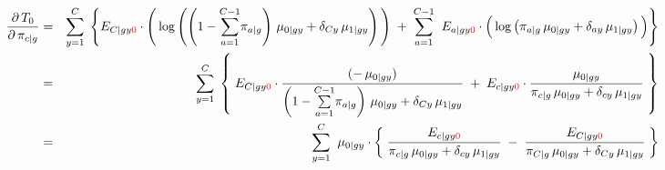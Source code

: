 \begin{eqnarray*}
\dfrac{\partial\,T_{0}}{\partial\,\pi_{c \vert g}}
&=&
	\overset{C}{\underset{y=1}{\sum}}\;
	\left\{
	E_{C \vert gy{\color{red}0}}
	\cdot
	\left(\,
		\overset{{\color{white}.}}{\log}\left(
			\left(1-\overset{C-1}{\underset{a=1}{\sum}}\pi_{a \vert g}\right)\,\mu_{0 \vert gy}
			+
			\delta_{Cy}\,\mu_{1\vert gy}
			\right)
	\,\right)
	\;+\;
	\overset{C-1}{\underset{a=1}{\sum}}\;\;
	E_{a \vert gy{\color{red}0}}
	\cdot
	\left(\,
		\overset{{\color{white}.}}{\log}\left(\pi_{a \vert g}\,\mu_{0 \vert gy} + \delta_{ay}\,\mu_{1\vert gy}\right)
	\,\right)
	\right\}
\\
&=&
	\overset{C}{\underset{y=1}{\sum}}\;
	\left\{\;
	E_{C \vert gy{\color{red}0}}
	\cdot
	\dfrac{(-\,\mu_{0 \vert gy})}{
		\left(1-\overset{C-1}{\underset{a=1}{\sum}}\pi_{a \vert g}\right)\,\mu_{0 \vert gy}+\delta_{Cy}\,\mu_{1\vert gy}
		}
	\;+\;
	E_{c \vert gy{\color{red}0}}
	\cdot
	\dfrac{\mu_{0 \vert gy}}{\pi_{c \vert g}\,\mu_{0 \vert gy} + \delta_{cy}\,\mu_{1\vert gy}}
	\;\right\}
\\
&=&
	\overset{C}{\underset{y=1}{\sum}}\;\;
	\mu_{0 \vert gy}
	\cdot
	\left\{\;
		\dfrac{E_{c \vert gy{\color{red}0}}}{\pi_{c \vert g}\,\mu_{0 \vert gy} + \delta_{cy}\,\mu_{1\vert gy}}
		\;-\;
		\dfrac{E_{C \vert gy{\color{red}0}}}{
			\pi_{C \vert g}\,\mu_{0 \vert gy}+\delta_{Cy}\,\mu_{1\vert gy}
			}
	\;\right\}
\end{eqnarray*}

